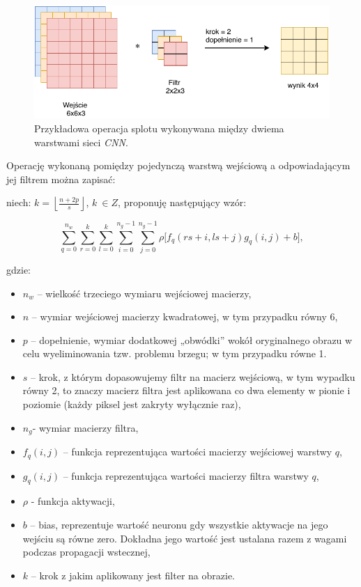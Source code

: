 \begin{figure}[ht]
\centerline{\includegraphics[scale=0.8]{resources/cnn/splot_w_cnn.pdf}}
\caption{Przykładowa operacja splotu wykonywana między dwiema warstwami sieci \textit{CNN}.}
\label{fig:splot}
\end{figure}

Operację wykonaną pomiędzy pojedynczą warstwą wejściową a odpowiadającym jej filtrem można zapisać:

niech: \(k = \left\lfloor \frac{n + 2p}{s} \right\rfloor\), \(k\ \in Z\), proponuję następujący wzór:

\[\sum_{q = 0}^{n_{w}}{\sum_{r = 0}^{k}{\sum_{l = 0}^{k}\sum_{i = 0}^{n_{g} - 1}{\sum_{j = 0}^{n_{g} - 1}{\rho\lbrack f_{q}\left( rs + i,ls + j \right) g_{q}\left( i,j \right) + b\rbrack}}}}, \tag{9}\]

gdzie:

\begin{itemize}
\item
  \(n_{w}\) -- wielkość trzeciego wymiaru wejściowej macierzy,
\item
  \(n\) -- wymiar wejściowej macierzy kwadratowej, w tym przypadku równy 6,
\item
  \(p\) -- dopełnienie, wymiar dodatkowej „obwódki'' wokół oryginalnego
  obrazu w celu wyeliminowania tzw. problemu brzegu; w tym przypadku
  równe 1.
\item
  \(s\) -- krok, z którym dopasowujemy filtr na macierz wejściową, w tym
  wypadku równy 2, to znaczy macierz filtra jest aplikowana co dwa
  elementy w pionie i poziomie (każdy piksel jest zakryty wyłącznie
  raz),
\item
  \(n_{g}\)- wymiar macierzy filtra,
\item
  \(f_{q}(i,j)\) -- funkcja reprezentująca wartości macierzy wejściowej
  warstwy \(q\),
\item
  \(g_{q}(i,j)\) -- funkcja reprezentująca wartości macierzy filtra
  warstwy \(q\),
\item
  \(\rho\) - funkcja aktywacji,
\item
  \(b\) -- bias, reprezentuje wartość neuronu gdy wszystkie aktywacje na jego wejściu są równe zero. Dokładna jego wartość jest ustalana razem z wagami podczas propagacji wstecznej,
\item
  \(k\) -- krok z jakim aplikowany jest filter na obrazie.
\end{itemize}


